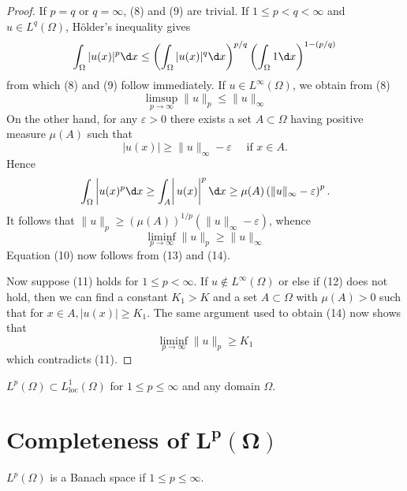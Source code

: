 \begin{proof}
  If $p=q$ or $q=\infty$, (8) and (9) are trivial. If $1 \leq p<q<\infty$ and $u \in L^q(\Omega)$, Hölder's inequality gives
  \[
  \int_{\Omega}|u(x)|^p \d x \leq\left(\int_{\Omega}|u(x)|^q \d x\right)^{p / q}\left(\int_{\Omega} 1 \d x\right)^{1-(p / q)}
  \]
  from which (8) and (9) follow immediately. If $u \in L^{\infty}(\Omega)$, we obtain from (8)
  \begin{equation}\label{eq:2.13}
    \limsup_{p\rightarrow \infty}\|u\|_p \leq\|u\|_{\infty}
  \end{equation}
  On the other hand, for any $\varepsilon>0$ there exists a set $A \subset \Omega$ having positive measure $\mu(A)$ such that
  \[
  |u(x)| \geq\|u\|_{\infty}-\varepsilon \quad \text { if } x \in A .
  \]
  Hence
  \[
  \left.\int_{\Omega}\left|u(x)^p \d x \geq \int_A\right| u(x)\right|^p \d x \geq \mu(A)\left(\|u\|_{\infty}-\varepsilon\right)^p .
  \]
  It follows that $\|u\|_p \geq(\mu(A))^{1 / p}\left(\|u\|_{\infty}-\varepsilon\right)$, whence
  \begin{equation}\label{eq:2.14}
    \liminf_{p \rightarrow \infty}\|u\|_p \geq\|u\|_{\infty}
  \end{equation}
  Equation (10) now follows from (13) and (14).
  
  Now suppose (11) holds for $1 \leq p<\infty$. If $u \notin L^{\infty}(\Omega)$ or else if (12) does not hold, then we can find a constant $K_1>K$ and a set $A \subset \Omega$ with $\mu(A)>0$ such that for $x \in A,|u(x)| \geq K_1$. The same argument used to obtain (14) now shows that
  \[
  \liminf _{p \rightarrow \infty}\|u\|_p \geq K_1
  \]
  which contradicts (11).
\end{proof}

\begin{corollary}
  $L^p(\Omega) \subset L_{\mathrm{loc}}^1(\Omega)$ for $1 \leq p \leq \infty$ and any domain $\Omega$.
\end{corollary}


\section[Completeness of $L^p(\Omega)$]{Completeness of $\bm{L^p(\Omega)}$}

\begin{theorem}
  $L^p(\Omega)$ is a Banach space if $1 \leq p \leq \infty$.
\end{theorem}

